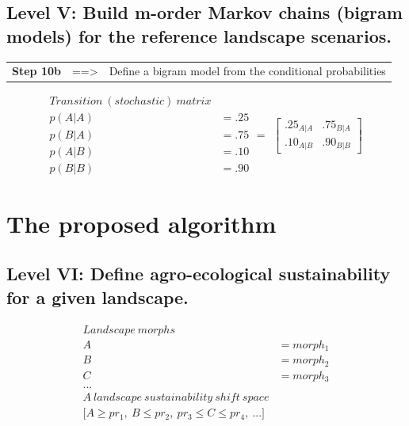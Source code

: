 \documentclass[
paper=128mm:96mm, %
fontsize=11pt, %
pagesize, %
parskip=half-, %
]{scrartcl} %
\theoremstyle{mythmstyle} %
\begin{document}
\subsection{Level V: Build m-order Markov chains (bigram models) for the reference landscape scenarios.}
\footnotesize 
\begin{tabular}{lll}
	\textbf{Step 10b} & ==> & Define a bigram model from the conditional probabilities \\
\end{tabular}
\begin{equation*}
\begin{aligned}
Transition \ (stochastic) \ matrix\\
p(A|A) \ &= .25\\
p(B|A) \ &= .75\\
p(A|B) \ &= .10\\
p(B|B) \ &= .90
\end{aligned}
=
\begin{aligned}
\begin{bmatrix}
	.25_{A|A} & .75_{B|A}\\
	.10_{A|B} & .90_{B|B}
\end{bmatrix}
\end{aligned}
\end{equation*}

\clearpage
\section{The proposed algorithm}
\subsection{Level VI: Define agro-ecological sustainability for a given landscape.}
\begin{equation*}
\begin{aligned}
Landscape \ morphs\\
A \ &= morph_{1}\\
B \ &= morph_{2}\\
C \ &= morph_{3}\\
...\\
A \ landscape \ sustainability \ shift \ space\\
\big[ A\geq  pr_{1}, \ B\leq pr_{2}, \ pr_{3}\leq C \leq pr_{4}, \ ... \big]
\end{aligned}
\end{equation*}
\end{document}
